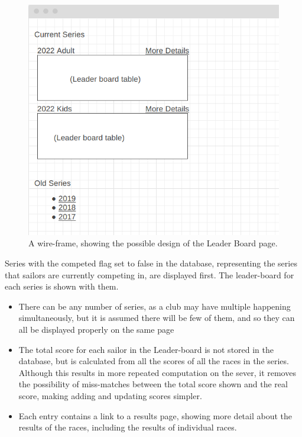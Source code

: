 \documentclass{l4proj}
\begin{document}
\begin{figure}[h!]
    \centering
    \includegraphics[width=1\linewidth]{images/IndexWireframe.png} 

    \caption{A wire-frame, showing the possible design of the Leader Board page.
    }

    \label{fig:LeaderBoardWF}
\end{figure}


Series with the competed flag set to false in the database, representing the series that sailors are currently competing in, are displayed first. The leader-board for each series is shown with them.
\begin{itemize}
    \item
    There can be any number of series, as a club may have multiple happening simultaneously, but it is assumed there will be few of them, and so they can all be displayed properly on the same page
    \item
    The total score for each sailor in the Leader-board is not stored in the database, but is calculated from all the scores of all the races in the series. Although this results in more repeated computation on the sever, it removes the possibility of miss-matches between the total score shown and the real score, making adding and updating scores simpler.
    \item
    Each entry contains a link to a results page, showing more detail about the results of the races, including the results of individual races.
\end{itemize}
    
\end{document}

